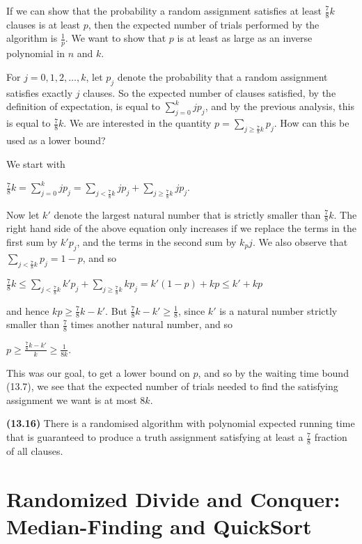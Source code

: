 \documentclass{proc}
\begin{document}
If we can show that the probability a random assignment satisfies at least $\frac{7}{8}k$ clauses is at least $p$, then the expected number of trials performed by the algorithm is $\frac{1}{p}$. We want to show that $p$ is at least as large as an inverse polynomial in $n$ and $k$.

For $j = 0, 1, 2, \ldots, k$, let $p_j$ denote the probability that a random assignment satisfies exactly $j$ clauses.  So the expected number of clauses satisfied, by the definition of expectation, is equal to $\sum_{j=0}^{k} jp_j$, and by the previous analysis, this is equal to $\frac{7}{8}k$. We are interested in the quantity $p = \sum_{j \ge \frac{7}{8}k} p_j$. How can this be used as a lower bound?

We start with 

$\frac{7}{8}k = \sum_{j=0}^{k} jp_j = \sum_{j < \frac{7}{8}k} jp_j + \sum_{j \ge \frac{7}{8}k} jp_j$.

Now let $k'$ denote the largest natural number that is strictly smaller than $\frac{7}{8}k$. The right hand side of the above equation only increases if we replace the terms in the first sum by $k'p_j$, and the terms in the second sum by $k_pj$. We also observe that $\sum_{j<\frac{7}{8}k} p_j = 1 - p$, and so

$ \frac{7}{8}k \le \sum_{j<\frac{7}{8}k} k'p_j + \sum_{j \ge \frac{7}{8}k} kp_j = k'(1-p) + kp \le k' + kp $

and hence $kp \ge \frac{7}{8}k - k'$. But $\frac{7}{8}k - k' \ge \frac{1}{8}$, since $k'$ is a natural number strictly smaller than $\frac{7}{8}$ times another natural number, and so 

$p \ge \frac{\frac{7}{8}k - k'}{k} \ge \frac{1}{8k}$.

This was our goal, to get a lower bound on $p$, and so by the waiting time bound (13.7), we see that the expected number of trials needed to find the satisfying assignment we want is at most $8k$.

\begin{mdframed}
    \textbf{(13.16)} There is a randomised algorithm with polynomial expected running time that is guaranteed to produce a truth assignment satisfying at least a $\frac{7}{8}$ fraction of all clauses.
\end{mdframed}

\section{Randomized Divide and Conquer: Median-Finding and QuickSort}
\end{document}
